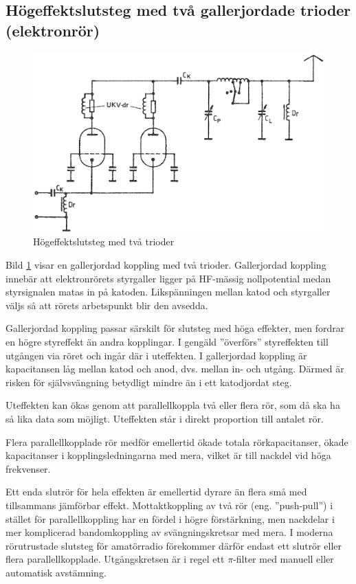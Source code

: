 \subsection{Högeffektslutsteg med två gallerjordade trioder (elektronrör)}

\begin{figure}
\includegraphics[width=\textwidth]{images/cropped_pdfs/bild_2_3-51.pdf}
\caption{Högeffektslutsteg med två trioder}
\label{fig:BildII3-51}
\end{figure}

Bild \ref{fig:BildII3-51} visar en gallerjordad koppling med två trioder.
Gallerjordad koppling innebär att elektronrörets styrgaller ligger på
HF-mässig nollpotential medan styrsignalen matas in på katoden.
Likspänningen mellan katod och styrgaller väljs så att rörets arbetspunkt blir
den avsedda.

Gallerjordad koppling passar särskilt för slutsteg med höga effekter,
men fordrar en högre styreffekt än andra kopplingar.
I gengäld ''överförs'' styreffekten till utgången via röret och ingår där i
uteffekten.
I gallerjordad koppling är kapacitansen låg mellan katod och anod, dvs.
mellan in- och utgång.
Därmed är risken för självsvängning betydligt mindre än i ett katodjordat steg.

Uteffekten kan ökas genom att parallellkoppla två eller flera rör, som då ska
ha så lika data som möjligt.
Uteffekten står i direkt proportion till antalet rör.

Flera parallellkopplade rör medför emellertid ökade totala rörkapacitanser,
ökade kapacitanser i kopplingsledningarna med mera, vilket är till nackdel vid
höga frekvenser.

Ett enda slutrör för hela effekten är emellertid dyrare än flera små
med tillsammans jämförbar effekt.
Mottaktkoppling av två rör (eng. ''push-pull'') i stället för parallellkoppling
har en fördel i högre förstärkning, men nackdelar i mer komplicerad
bandomkoppling av svängningskretsar med mera.
I moderna rörutrustade slutsteg för amatörradio förekommer därför endast ett
slutrör eller flera parallellkopplade.
Utgångskretsen är i regel ett \(\pi \)-filter med manuell eller automatisk
avstämning.

